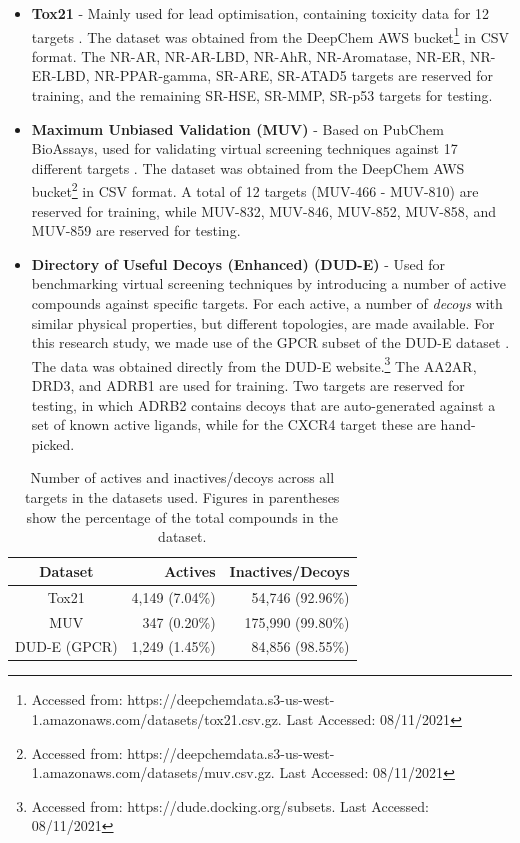 \begin{itemize}
    \item \textbf{Tox21} \cite{huang2016tox21challenge} - Mainly used for lead optimisation, containing toxicity data for 12 targets \citep{tox21}. The dataset was obtained from the DeepChem AWS bucket\footnote{Accessed from: https://deepchemdata.s3-us-west-1.amazonaws.com/datasets/tox21.csv.gz. Last Accessed: 08/11/2021} in CSV format. The NR-AR, NR-AR-LBD, NR-AhR, NR-Aromatase, NR-ER, NR-ER-LBD, NR-PPAR-gamma, SR-ARE, SR-ATAD5 targets are reserved for training, and the remaining SR-HSE, SR-MMP, SR-p53 targets for testing.
    \item \textbf{Maximum Unbiased Validation (MUV)} \citep{rohrer2009maximum} - Based on PubChem BioAssays, used for validating virtual screening techniques against 17 different targets \citep{rohrer2009maximum}. The dataset was obtained from the DeepChem AWS bucket\footnote{Accessed from: https://deepchemdata.s3-us-west-1.amazonaws.com/datasets/muv.csv.gz. Last Accessed: 08/11/2021} in CSV format. A total of 12 targets (MUV-466 - MUV-810) are reserved for training, while MUV-832, MUV-846, MUV-852, MUV-858, and MUV-859 are reserved for testing.
    \item \textbf{Directory of Useful Decoys (Enhanced) (DUD-E)} \cite{mysinger2012directory} - Used for benchmarking virtual screening techniques by introducing a number of active compounds against specific targets. For each active, a number of \textit{decoys} with similar physical properties, but different topologies, are made available. For this research study, we made use of the GPCR subset of the DUD-E dataset \citep{mysinger2012directory}. The data was obtained directly from the DUD-E website.\footnote{Accessed from: https://dude.docking.org/subsets. Last Accessed: 08/11/2021} The AA2AR, DRD3, and ADRB1 are used for training. Two targets are reserved for testing, in which ADRB2 contains decoys that are auto-generated against a set of known active ligands, while for the CXCR4 target these are hand-picked. 
\end{itemize}

\begin{table}[h]
	\centering
	\caption{Number of actives and inactives/decoys across all targets in the datasets used. Figures in parentheses show the percentage of the total compounds in the dataset.}
	\begin{tabular}{@{}crr@{}}
		\hline
		Dataset & Actives & Inactives/Decoys \\
		\hline
		Tox21 & 4,149 (7.04\%) & 54,746 (92.96\%) \\
		\hline
		MUV & 347 (0.20\%) & 175,990 (99.80\%) \\
		\hline
		DUD-E (GPCR) & 1,249 (1.45\%) & 84,856 (98.55\%) \\
	\end{tabular}
	\label{table:datasetimbalance}
\end{table}

